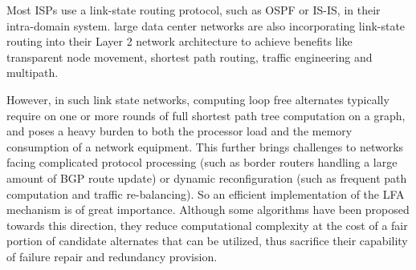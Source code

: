 Most ISPs use a link-state routing protocol, such as OSPF or IS-IS, in their intra-domain system.
large data center networks are also incorporating link-state routing into their Layer 2 network architecture \cite{perlman2011introduction, TRILL}
to achieve benefits like transparent node movement, shortest path routing, traffic engineering and multipath.


However, in such link state networks, computing loop free alternates typically require on one or more rounds
of full shortest path tree computation on a graph, and poses a heavy burden to both the processor load and
the memory consumption of a network equipment. This further brings challenges to networks
facing complicated protocol processing (such as border routers handling a large amount of BGP route update)
or dynamic reconfiguration (such as frequent path computation and traffic re-balancing).
So an efficient implementation of the LFA mechanism is of great importance. Although some algorithms \cite{TBFH, Geng2018A}
have been proposed towards this direction, they reduce computational complexity at the cost of
a fair portion of candidate alternates that can be utilized, thus sacrifice their capability of failure repair and
redundancy provision.

